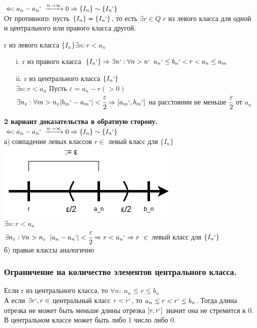 \documentclass[12pt, a4paper]{article}
\newcommand{\eps}{\varepsilon}
\begin{document}
\begin{centering}
\begin{tcolorbox}[title=Доказательство Т1, breakable]
$\Leftarrow: a_n - a_n`\; \xrightarrow{n\rightarrow \infty} 0 \Rightarrow \{ I_n \} \sim \{ I_n` \}$\\
От противного: пусть $\{ I_n \} \nsim \{ I_n` \}$, то есть $\exists r \in Q\; r$ из левого класса для одной и центрального или правого класса другой.

r из левого класса $\{ I_n \} \exists n: r < a_n$
\begin{enumerate}
    \item[i.] r из правого класса $\{ I_n` \} \Rightarrow \exists n`: \forall n > n`\;\; a_n` \leq b_n` < r < a_n \leq a_m$\\
    \item[ii.] r из центрального класса $\{ I_n` \}$\\
    $\exists n: r < a_n$ Пусть $\eps = a_n - r(>0)$\\
    $\exists n_\eps: \forall m > n_\eps |b_m`-a_m`| < \cfrac{\eps}{2} \Rightarrow [a_m`,b_m`]$ на расстоянии не меньше $\cfrac{\eps}{2}$ от $a_n$
\end{enumerate}

\textbf{2 вариант доказательства в обратную сторону.}\\
$\Leftarrow: a_n - a_n`\; \xrightarrow{n\rightarrow \infty} 0 \Rightarrow \{ I_n \} \sim \{ I_n` \}$\\
а) совпадение левых классов $r \in $ левый класс для $\{I_n\}$
\includegraphics[width=0.4\linewidth]{images/Дедекиндовы сечения/Доказательство Т1.2.png}\\
$\exists n: r < a_n$\\
$\exists n_\eps: \forall n>n_\eps \;\;|a_n-a_n`| < \cfrac{\eps}{2} \Rightarrow r < a_n` \Rightarrow r\ \in $ левый класс для $\{I_n`\}$ \\
б) правые классы аналогично
\end{tcolorbox}

\subsubsection{Ограничение на количество элементов центрального класса.}
Если r из центрального класса, то $\forall n: \; a_n \leq r \leq b_n$\\
А если $\exists r`,r \in $ центральный класс $r<r`$, то $a_n \leq r < r` \leq b_n$. Тогда длина отрезка не может быть меньше длины отрезка $[r,r`]$ значит она не стремится к 0.\\
В центральном классе может быть либо 1 число либо 0.

\end{centering}
\end{document}
